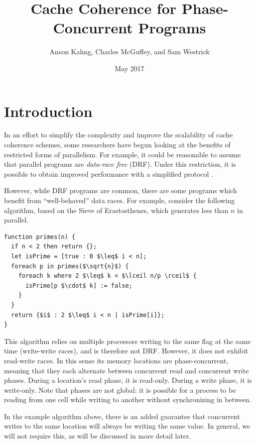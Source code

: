 \documentclass{article}
\title{Cache Coherence for Phase-Concurrent Programs}
\author{Anson Kahng, Charles McGuffey, and Sam Westrick}
\date{May 2017}
\begin{document}
\newcommand{\todo}[1]{{\color{red} \textbf{TODO}: {#1}}}

\maketitle

\section{Introduction}\label{sec:intro}

In an effort to simplify the complexity and improve the scalability of cache coherence schemes, some researchers have begun looking at the benefits of restricted forms of parallelism. For example, it could be reasonable to assume that parallel programs are \textit{data-race free} (DRF). Under this restriction, it is possible to obtain improved performance with a simplified protocol \cite{choi2010denovo} \cite{ros2012complexity}.

However, while DRF programs are common, there are some programs which benefit from ``well-behaved'' data races. For example, consider the following algorithm, based on the Sieve of Erastosthenes, which generates less than $n$ in parallel.

\begin{lstlisting}
function primes(n) {
  if n < 2 then return {};
  let isPrime = [true : 0 $\leq$ i < n];
  foreach p in primes($\sqrt{n}$) {
    foreach k where 2 $\leq$ k < $\lceil n/p \rceil$ {
      isPrime[p $\cdot$ k] := false;
    }
  }
  return {$i$ : 2 $\leq$ i < n | isPrime[i]};
}
\end{lstlisting}

This algorithm relies on multiple processors writing to the same flag at the same time (write-write races), and is therefore not DRF. However, it does not exhibit read-write races. In this sense its memory locations are phase-concurrent, meaning that they each alternate between concurrent read and concurrent write phases. During a location's read phase, it is read-only. During a write phase, it is write-only. Note that phases are not global: it is possible for a process to be reading from one cell while writing to another without synchronizing in between.

In the example algorithm above, there is an added guarantee that concurrent writes to the same location will always be writing the same value. In general, we will not require this, as will be discussed in more detail later.
\end{document}
